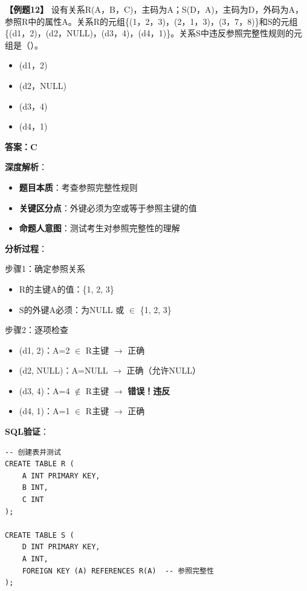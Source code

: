 \documentclass[12pt, a4paper]{article}
\newenvironment{bluebox}[1]{%
  \begin{trivlist}
  \item[\hskip\labelsep \textbf{#1}]
  \setlength{\parskip}{0.5ex}
  \setlength{\itemsep}{0.5ex}
}{%
  \end{trivlist}
  }
\begin{document}
\begin{bluebox}{例题12：参照完整性}
	\textbf{【例题12】} 设有关系R(A，B，C)，主码为A；S(D，A)，主码为D，外码为A，参照R中的属性A。关系R的元组\{(1，2，3)，(2，1，3)，(3，7，8)\}和S的元组\{(d1，2)，(d2，NULL)，(d3，4)，(d4，1)\}。关系S中违反参照完整性规则的元组是（\quad）。

	\begin{itemize}
		\item[A)] (d1，2)
		\item[B)] (d2，NULL)
		\item[C)] (d3，4)
		\item[D)] (d4，1)
	\end{itemize}

	\textbf{答案：C}

	\textbf{深度解析}：

	\begin{itemize}[leftmargin=*, nosep]
		\item \textbf{题目本质}：考查参照完整性规则
		\item \textbf{关键区分点}：外键必须为空或等于参照主键的值
		\item \textbf{命题人意图}：测试考生对参照完整性的理解
	\end{itemize}

	\textbf{分析过程}：

	步骤1：确定参照关系

	\begin{itemize}
		\item R的主键A的值：\{1, 2, 3\}
		\item S的外键A必须：为NULL 或 $\in$ \{1, 2, 3\}
	\end{itemize}

	步骤2：逐项检查

	\begin{itemize}[nosep]
		\item (d1, 2)：A=2 $\in$ R主键 $\to$ 正确
		\item (d2, NULL)：A=NULL $\to$ 正确（允许NULL）
		\item (d3, 4)：A=4 $\notin$ R主键 $\to$ \textbf{错误！违反}
		\item (d4, 1)：A=1 $\in$ R主键 $\to$ 正确
	\end{itemize}

	\textbf{SQL验证}：
	\begin{verbatim}
-- 创建表并测试
CREATE TABLE R (
    A INT PRIMARY KEY,
    B INT,
    C INT
);

CREATE TABLE S (
    D INT PRIMARY KEY,
    A INT,
    FOREIGN KEY (A) REFERENCES R(A)  -- 参照完整性
);


\end{verbatim}
\end{bluebox}
\end{document}
